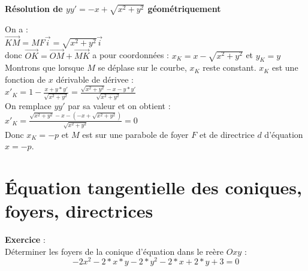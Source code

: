 \documentclass[a4paper,11pt]{book}
\begin{document}
{\bf R\'esolution de $yy'=-x+\sqrt{x^2+y^2}$ g\'eom\'etriquement}

On a :\\
$\overrightarrow{KM}=MF\overrightarrow{i}=\sqrt{x^2+y^2}\overrightarrow{i}$ \\
donc $\overrightarrow{OK}=\overrightarrow{OM}+\overrightarrow{MK}$ a pour coordonn\'ees :
$x_K=x-\sqrt{x^2+y^2}$ et $y_K=y$
Montrons que lorsque $M$ se d\'eplase sur le courbe, $x_K$ reste constant.
$x_K$ est une fonction de $x$ d\'erivable de d\'erivee :\\
$x'_K=1-\frac{x+y*y'}{\sqrt{x^2+y^2}}=\frac{\sqrt{x^2+y^2}-x-y*y'}{\sqrt{x^2+y^2}}$ \\
On remplace $yy'$ par sa valeur et on obtient :\\
$x'_K=\frac{\sqrt{x^2+y^2}-x-(-x+\sqrt{x^2+y^2})}{\sqrt{x^2+y^2}}=0$\\
Donc $x_K=-p$ et $M$ est sur une parabole de foyer $F$  et de directrice $d$
d'\'equation $x=-p$.

\section{\'Equation tangentielle des coniques, foyers, directrices}
{\bf Exercice} :\\
D\'eterminer les foyers de la conique d'\'equation dans le re\`ere $Oxy$ :
$$-2x^2-2*x*y-2*y^2-2*x+2*y+3=0$$
\end{document}
